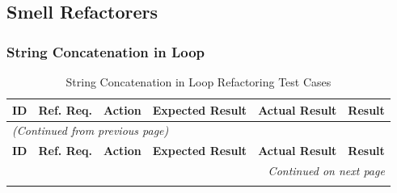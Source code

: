 \documentclass[12pt, titlepage]{article}
\begin{document}
\subsection{Smell Refactorers}

\subsubsection{String Concatenation in Loop}

\begin{longtable}{c 
  >{\raggedright\arraybackslash}p{1.5cm} 
  >{\raggedright\arraybackslash}p{4.5cm} 
  >{\raggedright\arraybackslash}p{4cm} 
  >{\raggedright\arraybackslash}p{3cm} c}
  \toprule
  \textbf{ID} & \textbf{Ref. Req.} & \textbf{Action} & \textbf{Expected Result} & \textbf{Actual Result} & \textbf{Result} \\ 
  \midrule
  \endfirsthead

  \multicolumn{6}{l}{\textit{(Continued from previous page)}} \\ 
  \toprule
  \textbf{ID} & \textbf{Ref. Req.} & \textbf{Action} & \textbf{Expected Result} & \textbf{Actual Result} & \textbf{Result} \\ 
  \midrule
  \endhead

  \multicolumn{6}{r}{\textit{Continued on next page}} \\
  \endfoot

  \bottomrule
  \caption{String Concatenation in Loop Refactoring Test Cases}
  \label{table:string_concat_refactoring_tests}
  \endlastfoot


\end{longtable}
\end{document}
